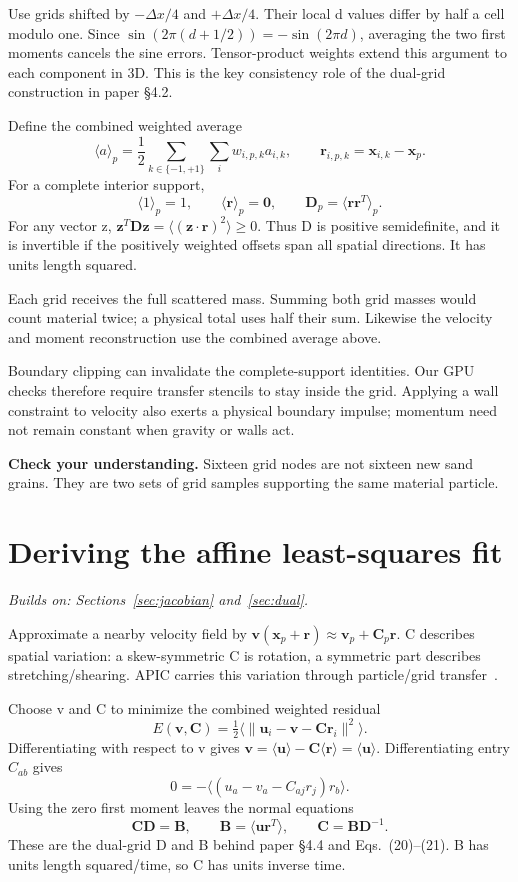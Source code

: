 \documentclass[11pt,a4paper]{article}
\newcommand{\mat}[1]{\mathbf{#1}}
\newcommand{\prereq}[1]{\textit{Builds on: #1}\par}
\newcommand{\checkpoint}[1]{\par\textbf{Check your understanding.} #1\par}
\numberwithin{equation}{section}
\begin{document}
Use grids shifted by $-\Delta x/4$ and $+\Delta x/4$. Their local d values
differ by half a cell modulo one. Since
$\sin(2\pi(d+1/2))=-\sin(2\pi d)$, averaging the two first moments cancels
the sine errors. Tensor-product weights extend this argument to each component
in 3D. This is the key consistency role of the dual-grid construction in
paper \S4.2.

Define the combined weighted average
\[
\langle a\rangle_p=\frac12\sum_{k\in\{-1,+1\}}\sum_i w_{i,p,k}a_{i,k},
\qquad \mat r_{i,p,k}=\mat x_{i,k}-\mat x_p.
\]
For a complete interior support,
\begin{equation}\label{eq:moments}
\langle1\rangle_p=1,\qquad \langle\mat r\rangle_p=\mat0,
\qquad \mat D_p=\langle\mat r\mat r^T\rangle_p.
\end{equation}
For any vector z,
$\mat z^T\mat D\mat z=\langle(\mat z\cdot\mat r)^2\rangle\ge0$.
Thus D is positive semidefinite, and it is invertible if the positively
weighted offsets span all spatial directions. It has units length squared.

Each grid receives the full scattered mass. Summing both grid masses would
count material twice; a physical total uses half their sum. Likewise the
velocity and moment reconstruction use the combined average above.

Boundary clipping can invalidate the complete-support identities. Our GPU
checks therefore require transfer stencils to stay inside the grid. Applying
a wall constraint to velocity also exerts a physical boundary impulse; momentum
need not remain constant when gravity or walls act.
\checkpoint{Sixteen grid nodes are not sixteen new sand grains. They are two
sets of grid samples supporting the same material particle.}

\section{Deriving the affine least-squares fit}\label{sec:apic}
\prereq{Sections~\ref{sec:jacobian} and~\ref{sec:dual}.}
Approximate a nearby velocity field by
$\mat v(\mat x_p+\mat r)\approx\mat v_p+\mat C_p\mat r$.
C describes spatial variation: a skew-symmetric C is rotation, a symmetric
part describes stretching/shearing. APIC carries this variation through
particle/grid transfer~\cite{apic}.

Choose v and C to minimize the combined weighted residual
\begin{equation}\label{eq:fit}
E(\mat v,\mat C)=\tfrac12\langle\|\mat u_i-\mat v-\mat C\mat r_i\|^2\rangle.
\end{equation}
Differentiating with respect to v gives
$\mat v=\langle\mat u\rangle-\mat C\langle\mat r\rangle
=\langle\mat u\rangle$.
Differentiating entry $C_{ab}$ gives
\[
0=-\langle(u_a-v_a-C_{aj}r_j)r_b\rangle.
\]
Using the zero first moment leaves the normal equations
\begin{equation}\label{eq:affine-fit}
\mat C\mat D=\mat B,\qquad
\mat B=\langle\mat u\mat r^T\rangle,\qquad
\boxed{\mat C=\mat B\mat D^{-1}}.
\end{equation}
These are the dual-grid D and B behind paper \S4.4 and Eqs.~(20)--(21).
B has units length squared/time, so C has units inverse time.
\end{document}
